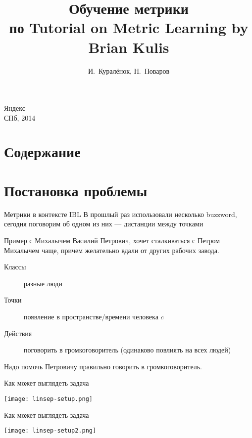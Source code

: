\documentclass[14pt, fleqn, xcolor={dvipsnames, table}]{beamer}
\title{Обучение метрики\\\small{по Tutorial on Metric Learning by Brian Kulis}}
\author[]{\small{%
И.~Куралёнок,
Н.~Поваров}}
\date{}
\begin{document}
\begin{frame}
\maketitle
\small
\begin{center}
\vspace{-60pt}
\normalsize {\color{red}Я}ндекс \\
\vspace{80pt}
\footnotesize СПб, 2014
\end{center}
\end{frame}

\section{Содержание}
\section{Постановка проблемы}
\begin{frame}{Метрики в контексте IBL}
В прошлый раз использовали несколько buzzword, сегодня поговорим об одном из них --- дистанции между точками
\end{frame}

\begin{frame}{Пример с Михалычем}
Василий Петрович, хочет сталкиваться с Петром Михалычем чаще, причем желательно вдали от других рабочих завода.
\begin{description}
\item[Классы] разные люди
\item[Точки] появление в пространстве/времени человека $c$
\item[Действия] поговорить в громкоговоритель (одинаково повлиять на всех людей)
\end{description}
Надо помочь Петровичу правильно говорить в громкоговоритель.
\end{frame}

\begin{frame}{Как может выглядеть задача}
\begin{center}
\texttt{[image: linsep-setup.png]}
\end{center}
\end{frame}

\begin{frame}{Как может выглядеть задача}
\begin{center}
\texttt{[image: linsep-setup2.png]}
\end{center}
\end{frame}
\end{document}
